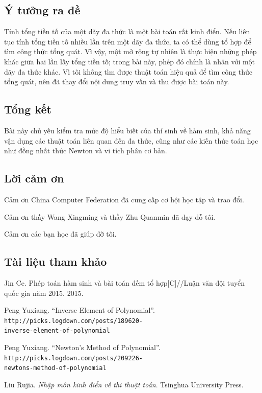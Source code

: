 \documentclass[11pt]{article}
\begin{document}
\subsection{Ý tưởng ra đề}

Tính tổng tiền tố của một dãy đa thức là một bài toán rất kinh điển. Nếu liên
tục tính tổng tiền tố nhiều lần trên một dãy đa thức, ta có thể dùng tổ hợp để
tìm công thức tổng quát. Vì vậy, một mở rộng tự nhiên là thực hiện những phép
khác giữa hai lần lấy tổng tiền tố; trong bài này, phép đó chính là nhân với
một dãy đa thức khác. Vì tôi không tìm được thuật toán hiệu quả để tìm công
thức tổng quát, nên đã thay đổi nội dung truy vấn và thu được bài toán này.

\subsection{Tổng kết}

Bài này chủ yếu kiểm tra mức độ hiểu biết của thí sinh về hàm sinh, khả năng
vận dụng các thuật toán liên quan đến đa thức, cũng như các kiến thức toán học
như đồng nhất thức Newton và vi tích phân cơ bản.

\subsection*{Lời cảm ơn}

Cảm ơn China Computer Federation đã cung cấp cơ hội học tập và trao đổi.

Cảm ơn thầy Wang Xingming và thầy Zhu Quanmin đã dạy dỗ tôi.

Cảm ơn các bạn học đã giúp đỡ tôi.

\subsection*{Tài liệu tham khảo}

\begin{enumerate}[label={[\arabic*]}]
  \item Jin Ce. Phép toán hàm sinh và bài toán đếm tổ hợp[C]//Luận văn đội
  tuyển quốc gia năm 2015. 2015.

  \item Peng Yuxiang. ``Inverse Element of Polynomial''.
  \texttt{http://picks.logdown.com/posts/189620-}\\
  \texttt{inverse-element-of-polynomial}

  \item Peng Yuxiang. ``Newton's Method of Polynomial''.
  \texttt{http://picks.logdown.com/posts/209226-}\\
  \texttt{newtons-method-of-polynomial}

  \item Liu Rujia. \emph{Nhập môn kinh điển về thi thuật toán}. Tsinghua
  University Press.
\end{enumerate}
\end{document}
